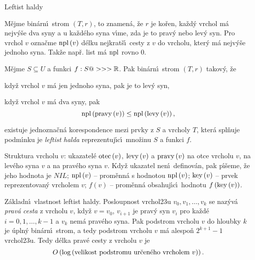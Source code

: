 \heading
Leftist haldy
\endheading

\flushpar M\v ejme bin\'arn\'\i\ strom $\left(T,r\right)$, to znamen\'a, \v ze $
r$ je ko\v ren, 
ka\v zd\'y vrchol m\'a nejv\'y\v se dva syny a u ka\v zd\'eho syna 
v\'\i me, zda je to prav\'y nebo lev\'y syn. Pro vrchol $v$ 
ozna\v cme $\operatorname{npl}\left(v\right)$ d\'elku nejkrat\v s\'\i\ cesty z $v$ do vrcholu, kter\'y m\'a 
nejv\'y\v se jednoho syna. Tak\v ze nap\v r. list m\'a $\operatorname{npl}$ rovno $
0$.
\medskip

\flushpar M\v ejme $S\subseteq U$ a funkci $f:S@>>>\Bbb R$. Pak bin\'arn\'\i\ strom 
$\left(T,r\right)$ takov\'y, \v ze
\roster
\item
kdy\v z vrchol $v$ m\'a jen jednoho syna, pak je to lev\'y syn,
\item
kdy\v z vrchol $v$ m\'a dva syny, pak 
$$\operatorname{npl}\left(\operatorname{pravy}\left(v\right)\right)\le\operatorname{npl}\left(\operatorname{levy}\left(v\right)\right),$$
\item
existuje jednozna\v cn\'a korespondence mezi prvky z $S$ a 
vrcholy $T$, kter\'a spl\v nuje podm\'\i nku 
\endroster
je \emph{leftist} \emph{halda} 
reprezentuj\'\i c\'\i\ mno\v zinu $S$ a funkci $f$. 
\medskip

\flushpar Struktura vrcholu $v$:\newline 
ukazatel\'e $\operatorname{otec}\left(v\right)$, $\operatorname{levy}\left(v\right)$ a $\operatorname{pravy}\left(v\right)$ na otce vrcholu $
v$, 
na lev\'eho syna $v$ a na prav\'eho syna $v$. Kdy\v z ukazatel 
nen\'\i\ definov\'an, pak p\'\i\v seme, \v ze jeho hodnota je 
$NIL$;\newline 
$\operatorname{npl}\left(v\right)$ -- prom\v enn\'a s hodnotou $\operatorname{npl}\left(v\right)$;\newline 
$\operatorname{key}\left(v\right)$ -- prvek reprezentovan\'y vrcholem $v$;\newline 
$f\left(v\right)$ -- prom\v enn\'a obsahuj\'\i c\'\i\ hodnotu $f\left(\operatorname{key}\left(v\right)\right)$.
\medskip

\flushpar Z\'akladn\'\i\ vlastnost leftist haldy.\newline 
Posloupnost vrchol\accent23u $v_0,v_1,\dots,v_k$ se naz\'yv\'a 
\emph{prav\'a} \emph{cesta} z vrcholu $v$, kdy\v z $v=v_0$, $v_{i
+1}$ 
je prav\'y syn $v_i$ pro ka\v zd\'e $i=0,1,\dots,k-1$ a $v_k$ nem\'a 
prav\'eho syna. Pak podstrom vrcholu $v$ do hloubky $k$ je 
\'upln\'y bin\'arn\'\i\ strom, a tedy podstrom vrcholu $v$ m\'a 
alespo\v n $2^{k+1}-1$ vrchol\accent23u. Tedy d\'elka prav\'e 
cesty z vrcholu $v$ je 
$$O\left(\log\left(\text{\rm velikost podstromu ur\v cen\'eho vrcholem }v\right)\right).$$
\medskip

